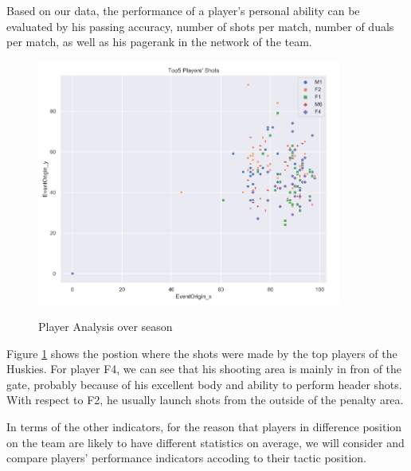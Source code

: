 \documentclass{mcmthesis}
\begin{document}
Based on our data, the performance of a player's personal ability can be evaluated by his passing accuracy, number of shots per match, number of duals per match, as well as his pagerank in the network of the team.
\begin{figure}[htbp]
  \centering
  \caption{Player Analysis over season}
  \includegraphics[width=10cm]{player.png}
  \label{player}
\end{figure}

Figure \ref{player} shows the postion where the shots were made by the top players of the Huskies. For player F4, we can see that his shooting area is mainly in fron of the gate, probably because of his excellent body and ability to perform header shots. With respect to F2, he usually launch shots from the outside of the penalty area.

In terms of the other indicators, for the reason that players in difference position on the team are likely to have different statistics on average, we will consider and compare players' performance indicators accoding to their tactic position.
\end{document}
